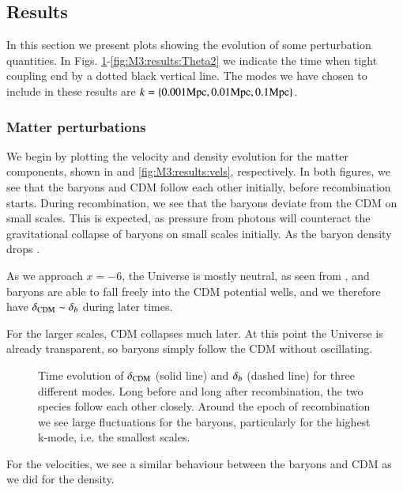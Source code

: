 \subsection{Results}\label{ssec:M3:results}
In this section we present plots showing the evolution of some perturbation quantities. In Figs. \ref{fig:M3:results:deltas}-\ref{fig:M3:results:Theta2} we indicate the time when tight coupling end by a dotted black vertical line. The modes we have chosen to include in these results are $k=\{ 0.001\mathrm{Mpc},0.01\mathrm{Mpc},0.1\mathrm{Mpc} \}$.

\subsubsection{Matter perturbations} \label{sssec:M3:results:matter_perturbations}
We begin by plotting the velocity and density evolution for the matter components, shown in  and \ref{fig:M3:results:vels}, respectively. In both figures, we see that the baryons and CDM follow each other initially, before recombination starts. During recombination, we see that the baryons deviate from the CDM on small scales. This is expected, as pressure from photons will counteract the gravitational collapse of baryons on small scales initially. As the baryon density drops . 

As we approach $x=-6$, the Universe is mostly neutral, as seen from , and baryons are able to fall freely into the CDM potential wells, and we therefore have $\delta_\mathrm{CDM}\sim\delta_b$ during later times. 

For the larger scales, CDM collapses much later. At this point the Universe is already transparent, so baryons simply follow the CDM without oscillating. 
\begin{figure}[ht!]
    \caption{Time evolution of $\delta_\mathrm{CDM}$ (solid line) and $\delta_b$ (dashed line) for three different modes. Long before and long after recombination, the two species follow each other closely. Around the epoch of recombination we see large fluctuations for the baryons, particularly for the highest k-mode, i.e. the smallest scales.}
    \label{fig:M3:results:deltas}
\end{figure}

For the velocities, we see a similar behaviour between the baryons and CDM as we did for the density.  

